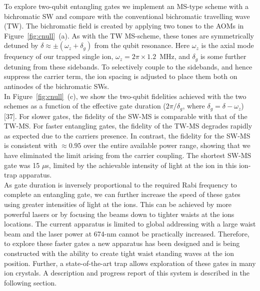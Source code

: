 \documentclass[12pt]{iopart}
\begin{document}
    To explore two-qubit entangling gates we implement an MS-type scheme
    with a bichromatic SW and compare with the conventional
    bichromatic travelling wave (TW). The bichromatic field is created by applying two
    tones to the AOMs in Figure~\ref{fig:cnull}~(a). As with the TW MS-scheme, these
    tones are symmetrically detuned by $\delta \approx \pm(\omega_z + \delta_g) $ from the
    qubit resonance. Here $\omega_z$ 
    is the axial mode frequency of our trapped single ion,
    $\omega_z = 2\pi\times 1.2$~MHz, and $\delta_g$ is some further detuning
    from these sidebands. To selectively couple to the sidebands, and
    hence suppress the carrier term, the ion spacing is adjusted to
    place them both on antinodes of the bichromatic SWs.\\
    In Figure~\ref{fig:cnull}~(c), we show the two-qubit fidelities
    achieved with the two schemes as a function of the effective gate
    duration ($2\pi/\delta_g$, where $\delta_g = \delta - \omega_z$)
    [37]. For slower gates, the fidelity of the SW-MS is comparable
    with that of the TW-MS. For faster entangling gates, the fidelity
    of the TW-MS degrades rapidly as expected due to the carriers
    presence. In contrast, the fidelity for the SW-MS is consistent
    with $\approx 0.95$ over the entire available power range, showing
    that we have eliminated the limit arising from the carrier
    coupling. The shortest SW-MS gate was 15 $\mu$s, limited by the achievable
    intensity of light at the ion in this ion-trap apparatus.\\
    As gate duration is inversely proportional to the required Rabi
    frequency to complete an entangling gate, we can further increase the
    speed of these gates using greater intensities of light at the
    ions. This can be achieved by more powerful lasers or by focusing
    the beams down to tighter waists at the ions locations. The
    current apparatus is limited to global addressing with a large
    waist beam and the laser power at 674-nm cannot be practically
    increased. Therefore, to explore these faster gates a new
    apparatus has been designed and is being constructed with the
    ability to create tight waist standing waves at the ion
    position. Further, a state-of-the-art trap allows exploration of
    these gates in many ion crystals. A description and progress
    report of this system is described in the following section.\\
\end{document}
